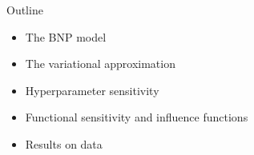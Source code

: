 \begin{frame}{Outline}
\begin{itemize}
\item The BNP model
\vspace{0.1in}

\item The variational approximation
\vspace{0.1in}

\item Hyperparameter sensitivity
\vspace{0.1in}

\item Functional sensitivity and influence functions
\vspace{0.1in}

\item Results on data
\vspace{0.1in}

\end{itemize}
\end{frame}
